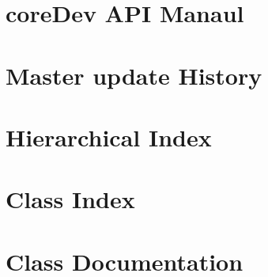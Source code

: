 \documentclass[twoside]{book}
\begin{document}
\chapter{core\-Dev A\-P\-I Manaul}
\label{md__home_kimdj_project_coreDoc_doc_coredev_api}
\hypertarget{md__home_kimdj_project_coreDoc_doc_coredev_api}{}

\chapter{Master update History}
\label{md__home_kimdj_project_decat_doc_MasterHistory}
\hypertarget{md__home_kimdj_project_decat_doc_MasterHistory}{}

\chapter{Hierarchical Index}

\chapter{Class Index}

\chapter{Class Documentation}



















\newpage
{}
{}
\printindex
\end{document}

